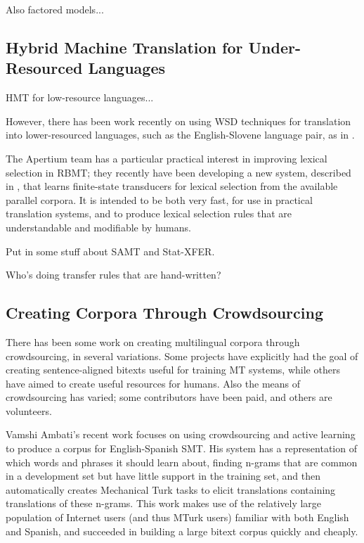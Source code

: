 Also factored models...
\cite{yeniterzi-oflazer:2010:ACL}

\subsection{Hybrid Machine Translation for Under-Resourced Languages}
HMT for low-resource languages...

However, there has been work recently on using WSD techniques for translation
into lower-resourced languages, such as the English-Slovene language pair, as
in \cite{vintar-fivser-vrvsvcaj:2012:ESIRMT-HyTra2012}. 

The Apertium team has a particular practical interest in improving lexical
selection in RBMT; they recently have been developing
a new system, described in \cite{tyers-fst}, that learns finite-state
transducers for lexical selection from the available parallel corpora. It is
intended to be both very fast, for use in practical translation systems, and
to produce lexical selection rules that are understandable and modifiable by
humans.

Put in some stuff about SAMT and Stat-XFER.

Who's doing transfer rules that are hand-written?


\subsection{Creating Corpora Through Crowdsourcing}
There has been some work on creating multilingual corpora through
crowdsourcing, in several variations. Some projects have explicitly had the
goal of creating sentence-aligned bitexts useful for training MT systems, while
others have aimed to create useful resources for humans. Also the means of
crowdsourcing has varied; some contributors have been paid, and others are
volunteers.

Vamshi Ambati's recent work \cite{ambati_naacl,ambati_act} focuses on using
crowdsourcing and active learning to produce a corpus for English-Spanish SMT.
His system has a representation of which words and phrases it should learn
about, finding n-grams that are common in a development set but have little
support in the training set, and then automatically creates Mechanical Turk
tasks to elicit translations containing translations of these n-grams. This
work makes use of the relatively large population of Internet users (and thus
MTurk users) familiar with both English and Spanish, and succeeded in building
a large bitext corpus quickly and cheaply.

